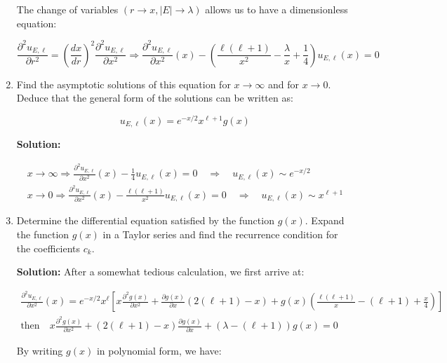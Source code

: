 \documentclass{article}
\begin{document}
\begin{enumerate}
{    The change of variables $(r \rightarrow x, |E| \rightarrow \lambda)$ allows us to have a dimensionless equation:

    $$
    \frac{\partial^{2} u_{E, \ell}}{\partial r^{2}} = \left(\frac{d x}{d r}\right)^{2} \frac{\partial^{2} u_{E, \ell}}{\partial x^{2}} \Rightarrow \frac{\partial^{2} u_{E, \ell}}{\partial x^{2}}(x) - \left(\frac{\ell(\ell+1)}{x^{2}} - \frac{\lambda}{x} + \frac{1}{4}\right) u_{E, \ell}(x) = 0
    $$}

    \item Find the asymptotic solutions of this equation for $x \rightarrow \infty$ and for $x \rightarrow 0$. Deduce that the general form of the solutions can be written as:

    $$
    u_{E, \ell}(x) = e^{-x / 2} x^{\ell+1} g(x)
    $$

    {\color{red}\textbf{Solution:}

    $$
    \begin{gathered}
    x \rightarrow \infty \Rightarrow \frac{\partial^{2} u_{E, \ell}}{\partial x^{2}}(x) - \frac{1}{4} u_{E, \ell}(x) = 0 \quad \Rightarrow \quad u_{E, \ell}(x) \sim e^{-x / 2} \\
    x \rightarrow 0 \Rightarrow \frac{\partial^{2} u_{E, \ell}}{\partial x^{2}}(x) - \frac{\ell(\ell+1)}{x^{2}} u_{E, \ell}(x) = 0 \quad \Rightarrow \quad u_{E, \ell}(x) \sim x^{\ell+1}
    \end{gathered}
    $$}

    \item Determine the differential equation satisfied by the function $g(x)$. Expand the function $g(x)$ in a Taylor series and find the recurrence condition for the coefficients $c_{k}$.

    {\color{red}\textbf{Solution:} After a somewhat tedious calculation, we first arrive at:

    $$
    \begin{gathered}
    \frac{\partial^{2} u_{E, \ell}}{\partial x^{2}}(x) = e^{-x / 2} x^{\ell} \left[x \frac{\partial^{2} g(x)}{\partial x^{2}} + \frac{\partial g(x)}{\partial x}(2(\ell+1) - x) + g(x) \left(\frac{\ell(\ell+1)}{x} - (\ell+1) + \frac{x}{4}\right)\right] \\
    \text{then} \quad x \frac{\partial^{2} g(x)}{\partial x^{2}} + (2(\ell+1) - x) \frac{\partial g(x)}{\partial x} + (\lambda - (\ell+1)) g(x) = 0
    \end{gathered}
    $$

    By writing $g(x)$ in polynomial form, we have:

}
\end{enumerate}
\end{document}
